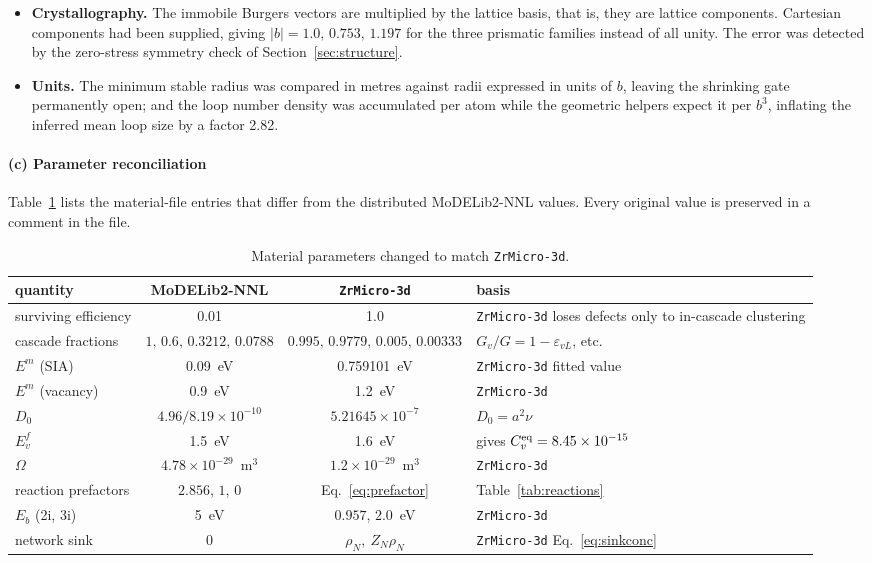 \documentclass{article}
\newcommand{\ZrM}{\texttt{ZrMicro-3d}}
\newcommand{\MoD}{\textsf{MoDELib2-NNL}}
\begin{document}
\begin{itemize}
\item \textbf{Crystallography.} The immobile Burgers vectors are multiplied by
the lattice basis, that is, they are lattice components. Cartesian components had
been supplied, giving $|b| = 1.0,\,0.753,\,1.197$ for the three prismatic
families instead of all unity. The error was detected by the zero-stress symmetry
check of Section~\ref{sec:structure}.

\item \textbf{Units.} The minimum stable radius was compared in metres against
radii expressed in units of $b$, leaving the shrinking gate permanently open; and
the loop number density was accumulated per atom while the geometric helpers
expect it per $b^3$, inflating the inferred mean loop size by a factor 2.82.
\end{itemize}

\paragraph*{(c) Parameter reconciliation}

Table~\ref{tab:params} lists the material-file entries that differ from the
distributed \MoD{} values. Every original value is preserved in a comment in the
file.

\begin{table}[htbp]
\centering
\caption{Material parameters changed to match \ZrM{}.}
\label{tab:params}
\small
\begin{tabular}{@{}lccp{}@{}}
\toprule
quantity & \MoD{} & \ZrM{} & basis \\
\midrule
surviving efficiency & 0.01 & 1.0 & \ZrM{} loses defects only to in-cascade clustering \\
cascade fractions & $1,\,0.6,\,0.3212,\,0.0788$ & $0.995,\,0.9779,\,0.005,\,0.00333$ & $G_v/G = 1-\varepsilon_{vL}$, etc. \\
$E^m$ (SIA) & 0.09~eV & 0.759101~eV & \ZrM{} fitted value \\
$E^m$ (vacancy) & 0.9~eV & 1.2~eV & \ZrM{} \\
$D_0$ & $4.96/8.19\times10^{-10}$ & $5.21645\times 10^{-7}$ & $D_0 = a^2\nu$ \\
$E^f_v$ & 1.5~eV & 1.6~eV & gives $C_v^{\rm eq} = 8.45\times10^{-15}$ \\
$\Omega$ & $4.78\times10^{-29}$~m$^3$ & $1.2\times10^{-29}$~m$^3$ & \ZrM{} \\
reaction prefactors & $2.856$, $1$, $0$ & Eq.~\eqref{eq:prefactor} & Table~\ref{tab:reactions} \\
$E_b$ (2i, 3i) & 5~eV & $0.957$, $2.0$~eV & \ZrM{} \\
network sink & $0$ & $\rho_N,\ Z_N\rho_N$ & \ZrM{} Eq.~\eqref{eq:sinkconc} \\
\bottomrule
\end{tabular}
\end{table}
\end{document}
